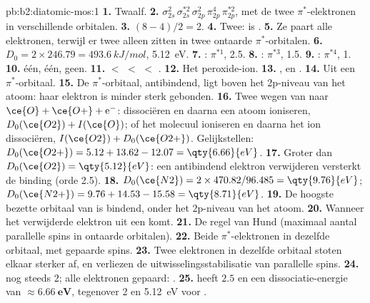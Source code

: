 \begin{solution}{pb:b2:diatomic-mos:1}
\textbf{1.} Twaalf.
\textbf{2.} $\sigma_{2s}^2\,\sigma_{2s}^{*2}\,\sigma_{2p}^2\,\pi_{2p}^4\,\pi_{2p}^{*2}$, met de twee $\pi^*$-elektronen
in verschillende orbitalen.
\textbf{3.} $(8 - 4)/2 = 2$.
\textbf{4.} Twee:  is .
\textbf{5.} Ze paart alle elektronen, terwijl er twee alleen zitten in twee ontaarde
$\pi^*$-orbitalen.
\textbf{6.} $D_0 = 2 \times 246.79 = \qty{493.6}{kJ/mol}$, \qty{5.12}{eV}.
\textbf{7.} : $\pi^{*1}$,  2.5.
\textbf{8.} : $\pi^{*3}$,  1.5.
\textbf{9.} : $\pi^{*4}$,  1.
\textbf{10.}  één,  één,  geen.
\textbf{11.}  $<$  $<$  $<$ .
\textbf{12.} Het peroxide-ion.
\textbf{13.} ,  en .
\textbf{14.} Uit een $\pi^*$-orbitaal.
\textbf{15.} De $\pi^*$-orbitaal, antibindend, ligt boven het 2p-niveau van het atoom: haar
elektron is minder sterk gebonden.
\textbf{16.} Twee wegen van  naar $\ce{O} + \ce{O+} + \mathrm e^-$: dissociëren en daarna
een atoom ioniseren, $D_0(\ce{O2}) + I(\ce{O})$; of het molecuul ioniseren en daarna het ion dissociëren,
$I(\ce{O2}) + D_0(\ce{O2+})$. Gelijkstellen: $D_0(\ce{O2+}) = 5.12 + 13.62 - 12.07 = \qty{6.66}{eV}$.
\textbf{17.} Groter dan $D_0(\ce{O2}) = \qty{5.12}{eV}$: een antibindend elektron verwijderen
versterkt de binding (orde 2.5).
\textbf{18.} $D_0(\ce{N2}) = 2 \times 470.82/96.485 = \qty{9.76}{eV}$; $D_0(\ce{N2+}) = 9.76 +
14.53 - 15.58 = \qty{8.71}{eV}$.
\textbf{19.} De hoogste bezette orbitaal van  is bindend, onder het 2p-niveau van het
atoom.
\textbf{20.} Wanneer het verwijderde elektron uit een  komt.
\textbf{21.} De regel van Hund (maximaal aantal parallelle spins in ontaarde orbitalen).
\textbf{22.} Beide $\pi^*$-elektronen in dezelfde orbitaal, met gepaarde spins.
\textbf{23.} Twee elektronen in dezelfde orbitaal stoten elkaar sterker af, en verliezen de
uitwisselingsstabilisatie van parallelle spins.
\textbf{24.}  nog steeds 2; alle elektronen gepaard: .
\textbf{25.}  heeft  $\boldsymbol{2.5}$ en een dissociatie-energie van
$\boldsymbol{\approx \qty{6.66}{eV}}$, tegenover 2 en \qty{5.12}{eV} voor .
\end{solution}
